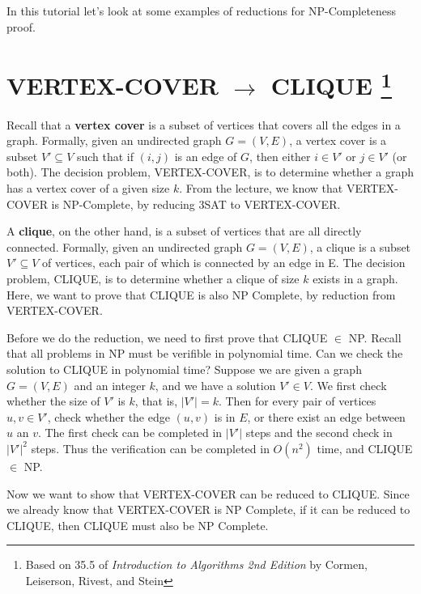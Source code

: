 \documentclass{article}
\begin{document}
In this tutorial let's look at some examples of reductions for
NP-Completeness proof.

\section{VERTEX-COVER $\rightarrow$ CLIQUE \footnote{Based on 35.5 of {\it Introduction to Algorithms
2nd Edition} by Cormen, Leiserson, Rivest, and Stein}}

Recall that a {\bf vertex cover} is a subset of vertices that covers all the 
edges in a graph.
Formally, given an undirected graph $G = (V, E)$, a vertex cover is a subset
$V' \subseteq V$ such that if $(i, j)$ is an edge of $G$, then either
$i \in V'$ or $j \in V'$ (or both).
The decision problem, VERTEX-COVER, is to determine whether a graph has a
vertex cover of a given size $k$.
From the lecture, we know that VERTEX-COVER is NP-Complete, by
reducing 3SAT to VERTEX-COVER. 

A {\bf clique}, on the other hand, 
is a subset of vertices that are all directly connected.
Formally, given an undirected graph $G = (V, E)$, a clique is a subset 
$V' \subseteq V$ of vertices, each pair of which is connected by an edge in E.
The decision problem, CLIQUE, is to determine whether a clique of size $k$
exists in a graph.
Here, we want to prove that CLIQUE is also NP Complete, by reduction from
VERTEX-COVER.

Before we do the reduction, we need to first prove that CLIQUE $\in$ NP.
Recall that all problems in NP must be verifible in polynomial time.
Can we check the solution to CLIQUE in polynomial time?
Suppose we are given a graph $G = (V, E)$ and an integer $k$, and we 
have a solution $V' \in V$. We first check whether the size of $V'$ is
$k$, that is, $|V'| = k$. Then for every pair of vertices $u, v \in V'$,
check whether the edge $(u, v)$ is in $E$, 
or there exist an edge between $u$ an $v$.
The first check can be completed in $|V'|$ steps and the second check in
$|V'|^{2}$ steps. Thus the verification can be completed in $O(n^2)$ time,
and CLIQUE $\in$ NP.

Now we want to show that VERTEX-COVER can be reduced to CLIQUE.
Since we already know that VERTEX-COVER is NP Complete, if it can be reduced
to CLIQUE, then CLIQUE must also be NP Complete.
\end{document}

